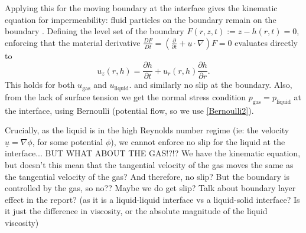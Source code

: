 \documentclass[11pt,a4paper]{article}
\begin{document}
	Applying this for the moving boundary at the interface gives the kinematic equation for impermeability: fluid particles on the boundary remain on the boundary . Defining the level set of the boundary $F(r,z,t) := z - h(r,t) = 0$, enforcing that the material derivative $\frac{DF}{Dt} = \left( \frac{\partial} {\partial t} + \underline{u}\cdot \nabla  \right)F = 0$ evaluates directly to
	\begin{equation}
		\label{BCKinetic}
		u_z(r,h) = \frac{\partial h}{\partial t} + u_r(r,h) \frac{\partial h}{\partial r}.
	\end{equation}
	This holds for both $u_\text{gas}$ and $u_\text{liquid}$.
	and similarly no slip at the boundary. Also, from the lack of surface tension we get the normal stress condition $p_\text{gas} = p_\text{liquid}$ at the interface, using Bernoulli (potential flow, so we use \eqref{Bernoulli2}).
	
	Crucially, as the liquid is in the high Reynolds number regime (ie: the velocity $\underline{u} = \nabla \phi$, for some potential $\phi$), we cannot enforce no slip for the liquid at the interface... BUT WHAT ABOUT THE GAS!?!? We have the kinematic equation, but doesn't this mean that the tangential velocity of the gas moves the same as the tangential velocity of the gas? And therefore, no slip? But the boundary is controlled by the gas, so no?? Maybe we do get slip? Talk about boundary layer effect in the report? (as it is a liquid-liquid interface vs a liquid-solid interface? Is it just the difference in viscosity, or the absolute magnitude of the liquid viscosity)
	
\end{document}
